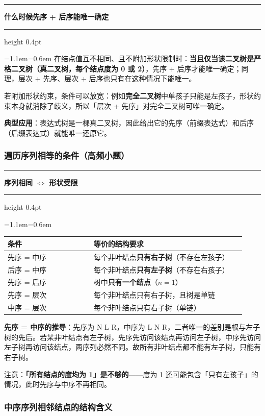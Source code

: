 \documentclass[11pt,openany,UTF8]{ctexbook}
\newcommand{\callouthead}[2]{%
  \par\addvspace{7pt}\noindent
  {\color{#1}\rule[-0.15em]{3pt}{1.05em}}\hspace{0.5em}%
  {\bfseries\color{#1}#2}\par\nobreak\vspace{-0.35em}%
  {\color{rulesep}\hrule height 0.4pt}\nobreak\vspace{0.45em}%
  \begingroup\small\setlength{\parindent}{0pt}%
  \leftskip=1.1em\rightskip=0.6em\noindent\ignorespaces}
\newcommand{\calloutend}{\par\endgroup\addvspace{7pt}}
\newenvironment{callkey}[1]{\callouthead{keybar}{#1}}{\calloutend}
\begin{document}
\begin{callkey}{什么时候先序 + 后序能唯一确定}
在结点值互不相同、且不附加形状限制时：\textbf{当且仅当该二叉树是严格二叉树（真二叉树，每个结点度为 0 或 2）}，先序 + 后序才能唯一确定；同理，层次 + 先序、层次 + 后序也只有在这种情况下能唯一。

若附加形状约束，条件可以放宽：例如\textbf{完全二叉树}中单孩子只能是左孩子，形状约束本身就消除了歧义，所以「层次 + 先序」对完全二叉树可唯一确定。

\textbf{典型应用}：表达式树是一棵真二叉树，因此给出它的先序（前缀表达式）和后序（后缀表达式）就能唯一还原它。

\end{callkey}

\subsubsection{遍历序列相等的条件（高频小题）}

\begin{callkey}{序列相同 $\Leftrightarrow$ 形状受限}
\begingroup\small\setlength{\tabcolsep}{4.0pt}
\begin{longtable}{@{}L{0.3412\linewidth}L{0.6045\linewidth}@{}}
\toprule
\textbf{条件} & \textbf{等价的结构要求} \\
\midrule
\endhead
先序 = 中序 & 每个非叶结点\textbf{只有右子树}（不存在左孩子） \\
后序 = 中序 & 每个非叶结点\textbf{只有左子树}（不存在右孩子） \\
先序 = 后序 & 树中\textbf{只有一个结点}（$n=1$） \\
先序 = 层次 & 每个非叶结点只有右子树，且树是单链 \\
中序 = 层次 & 每个非叶结点只有右子树（单链） \\
\bottomrule
\end{longtable}
\endgroup

\textbf{先序 = 中序的推导}：先序为 N L R，中序为 L N R，二者唯一的差别是根与左子树的先后。若某非叶结点有左子树，先序先访问该结点再访问左子树，中序先访问左子树再访问该结点，两序列必然不同。故所有非叶结点都不能有左子树，只能有右子树。

注意：\textbf{「所有结点的度均为 1」是不够的}——度为 1 还可能包含「只有左孩子」的情况，此时先序与中序不再相同。

\end{callkey}

\subsubsection{中序序列相邻结点的结构含义}
\end{document}
